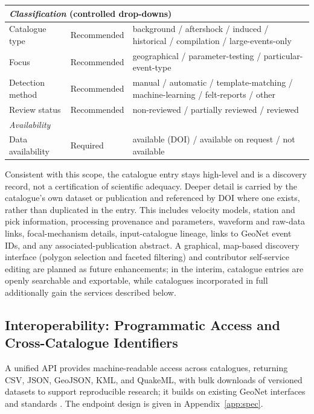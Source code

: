 \documentclass[11pt]{article}
\begin{document}
\begin{table}[H]
\begin{tabular}{p{3.4cm} p{2.2cm} p{7.4cm}}
\midrule
\multicolumn{3}{l}{\textit{Classification} (controlled drop-downs)} \\
\midrule
Catalogue type      & Recommended & \textsf{background} / \textsf{aftershock} / \textsf{induced} / \textsf{historical} / \textsf{compilation} / \textsf{large-events-only} \\
Focus               & Recommended & \textsf{geographical} / \textsf{parameter-testing} / \textsf{particular-event-type} \\
Detection method    & Recommended & \textsf{manual} / \textsf{automatic} / \textsf{template-matching} / \textsf{machine-learning} / \textsf{felt-reports} / \textsf{other} \\
Review status       & Recommended & \textsf{non-reviewed} / \textsf{partially reviewed} / \textsf{reviewed} \\
\midrule
\multicolumn{3}{l}{\textit{Availability}} \\
\midrule
Data availability   & Required    & \textsf{available (DOI)} / \textsf{available on request} / \textsf{not available} \\
\bottomrule
\end{tabular}
\end{table}

Consistent with this scope, the catalogue entry stays high-level and is a discovery record, not a certification of scientific adequacy. Deeper detail is carried by the catalogue's own dataset or publication and referenced by DOI where one exists, rather than duplicated in the entry. This includes velocity models, station and pick information, processing provenance and parameters, waveform and raw-data links, focal-mechanism details, input-catalogue lineage, links to GeoNet event IDs, and any associated-publication abstract. A graphical, map-based discovery interface (polygon selection and faceted filtering) and contributor self-service editing are planned as future enhancements; in the interim, catalogue entries are openly searchable and exportable, while catalogues incorporated in full additionally gain the services described below.

\subsection{Interoperability: Programmatic Access and Cross-Catalogue Identifiers}
A unified API provides machine-readable access across catalogues, returning CSV, JSON, GeoJSON, KML, and QuakeML, with bulk downloads of versioned datasets to support reproducible research; it builds on existing GeoNet interfaces and standards \citep{GeoNetAPI, GeoNetFDSN, QuakeML}. The endpoint design is given in Appendix~\ref{app:spec}.
\end{document}
